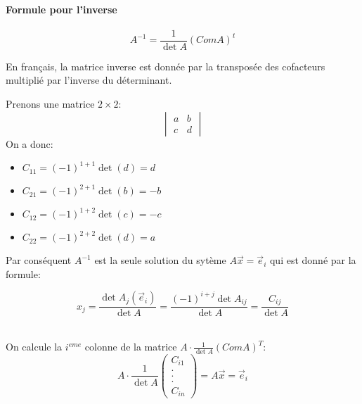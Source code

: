 \paragraph{Formule pour l'inverse}
\begin{definition}
    \begin{equation*}
        A^{-1} = \frac{1}{\det A}(ComA)^t
    \end{equation*}
\end{definition}
En français, la matrice inverse est donnée par la transposée des cofacteurs multiplié par l'inverse du déterminant.

\begin{exemple}
    Prenons une matrice $2 \times 2$:
    \[ \begin{vmatrix}
        a & b \\
        c & d
    \end{vmatrix}
    \]
    On a donc:
    \begin{itemize}
        \item $C_{11} = (-1)^{1+1}\det(d) = d$
        \item $C_{21} = (-1)^{2+1}\det(b) = -b$
        \item $C_{12} = (-1)^{1+2}\det(c) = -c$
        \item $C_{22} = (-1)^{2+2}\det(d) = a$
    \end{itemize}
\end{exemple}
Par conséquent $A^{-1}$ est la seule solution du sytème $A\vec{x} = \vec{e}_i$ qui est donné par la formule:
\begin{formule}

\[
    x_j = \frac{\det A_j (\vec{e}_i)}{\det A} = \frac{(-1)^{i+j}\det A_{ij}}{\det A} = \frac{C_{ij}}{\det A}
\]
\end{formule}
\\
On calcule la $i^{eme}$ colonne de la matrice $A\cdot\frac{1}{\det A}(ComA)^T$:
\[
A\cdot \frac{1}{\det A}\begin{pmatrix}
    C_{i1}\\
    .\\
    . \\
    . \\
    C_{in}
    
\end{pmatrix} = A\vec{x} = \vec{e}_i
\]

